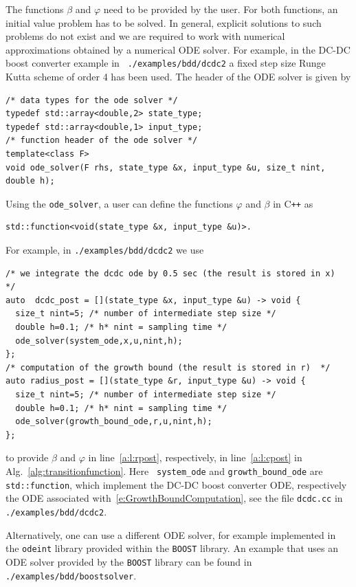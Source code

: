 \documentclass[a4paper]{amsart}
\newcommand\Cpp{C\texttt{++} }
\begin{document}
The functions $\beta$ and $\varphi$ need to be provided by the user. For both
functions, an initial value problem has to be solved. In general, explicit
solutions to such problems do not exist and we are required to work with
numerical approximations obtained by a numerical ODE
solver. For example, in the DC-DC boost converter example in {\tt\small
./examples/bdd/dcdc2} a fixed step size Runge Kutta scheme of order 4 has been
used. The header of the ODE solver is given by
\begin{lstlisting}[basicstyle=\footnotesize\ttfamily]
/* data types for the ode solver */
typedef std::array<double,2> state_type;
typedef std::array<double,1> input_type;
/* function header of the ode solver */
template<class F>
void ode_solver(F rhs, state_type &x, input_type &u, size_t nint, double h);   
\end{lstlisting}
Using the {\tt \small ode\_solver}, a user can define the functions $\varphi$
and $\beta$ in \Cpp as 
\begin{lstlisting}[basicstyle=\footnotesize\ttfamily]
std::function<void(state_type &x, input_type &u)>.
\end{lstlisting}
For example, in {\tt\small ./examples/bdd/dcdc2} we use
\begin{lstlisting}[basicstyle=\footnotesize\ttfamily]
/* we integrate the dcdc ode by 0.5 sec (the result is stored in x)  */
auto  dcdc_post = [](state_type &x, input_type &u) -> void {
  size_t nint=5; /* number of intermediate step size */
  double h=0.1; /* h* nint = sampling time */
  ode_solver(system_ode,x,u,nint,h);
};
/* computation of the growth bound (the result is stored in r)  */
auto radius_post = [](state_type &r, input_type &u) -> void {
  size_t nint=5; /* number of intermediate step size */
  double h=0.1; /* h* nint = sampling time */
  ode_solver(growth_bound_ode,r,u,nint,h);
};
\end{lstlisting}
to provide $\beta$ and $\varphi$ in  line~\ref{a:l:rpost}, respectively, in
line~\ref{a:l:cpost} in Alg.~\ref{alg:transitionfunction}.  Here {\tt\small
system\_ode} and {\tt\small growth\_bound\_ode} are {\tt\small std::function},
which implement the DC-DC boost converter ODE, respectively the ODE associated
with~\eqref{e:GrowthBoundComputation}, see the file {\tt\small dcdc.cc} in
{\tt\small ./examples/bdd/dcdc2}. 

Alternatively, one can use a different ODE solver, for example implemented in
the {\tt\small odeint} library provided within the {\tt\small BOOST} library. An
example that uses an ODE solver provided by the {\tt\small BOOST} library can
be found in {\tt\small ./examples/bdd/boostsolver}. 
\end{document}
